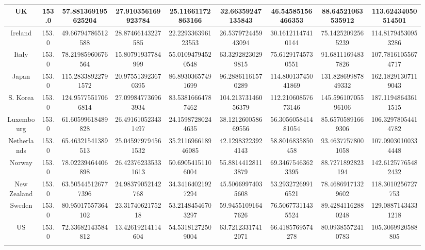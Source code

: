 \documentclass[10pt,legalpaper]{article}%
\begin{document}
\begin{tabular}{| c | c | c | c | c | c | c | c | c |}
\hline%
UK&153.0&57.881369195625204&27.910356169923784&25.11661172863166&32.66359247135843&46.54585156466353&88.64521063535912&113.62434050514501\\%
\hline%
Ireland&153.0&49.66794786512588&28.87466143227585&22.229336396123553&26.537972445943094&30.16121147410144&75.14252092565239&114.81794530953286\\%
\hline%
Italy&153.0&78.21985960676564&15.80791937784999&55.01094794520548&63.32928230299815&75.61291745730551&91.68111694837826&107.78161055674717\\%
\hline%
Japan&153.0&115.28338922791572&20.975513923670395&86.89303657491699&96.28861161570289&114.80013745041869&131.82869987849332&162.18291307119043\\%
\hline%
S. Korea&153.0&124.95775517066814&27.099847736963934&83.53816664787462&104.21373146056379&112.21060857673146&145.59610705596106&187.11948643611515\\%
\hline%
Luxembourg&153.0&61.60599618489828&26.491610523431497&24.15987280244635&38.121260058669556&56.305605841481054&85.65705891669306&106.32978054414782\\%
\hline%
Netherlands&153.0&65.46321541389513&25.045979794561532&35.211696618946085&42.12983223924143&58.8016835850458&93.46377578001058&107.09030100334448\\%
\hline%
Norway&153.0&78.02239464406898&26.423762335331613&50.69054151106004&55.88144128113879&69.34675463623395&88.7271892823194&142.61257765482432\\%
\hline%
New Zealand&153.0&63.505445126777396&24.98379052142768&34.34164021927294&45.50669974035608&53.29327269916521&78.46869171329602&118.3010256727753\\%
\hline%
Sweden&153.0&80.95017557364102&23.3174062175218&53.21484546703297&59.94551091647626&76.50677311435524&89.42841162880248&129.08871434331218\\%
\hline%
US&153.0&72.33682143584812&13.42619214114604&54.53181272509004&63.72123317412071&66.4185769574278&80.09385572410783&105.3069920588805\\%
&&&&&&&&\\%
\hline%
\end{tabular}

%
\end{document}
